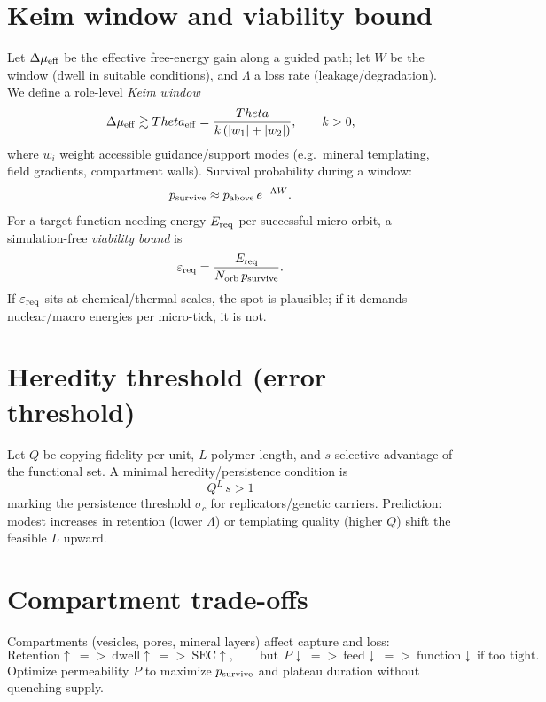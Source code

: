 \documentclass[12pt,a4paper,oneside]{scrreprt}
\def\Theta{Theta}%
\def\Rightarrow{=>}%
\begin{document}
\section{Keim window and viability bound}\label{sec:life-keim}
Let $\Delta\mu_{\rm eff}$ be the effective free-energy gain along a guided path; let $W$ be the window (dwell in suitable conditions), and $\Lambda$ a loss rate (leakage/degradation).
We define a role-level \emph{Keim window}
\begin{equation}
\Delta\mu_{\rm eff} \gtrsim \Theta_{\rm eff}
=\frac{\Theta}{k\,(|w_1|+|w_2|)},
\qquad k>0,
\end{equation}
where $w_i$ weight accessible guidance/support modes (e.g.\ mineral templating, field gradients, compartment walls). 
Survival probability during a window:
\begin{equation}
p_{\rm survive}\approx p_{\rm above}\,e^{-\Lambda W}.
\end{equation}
For a target function needing energy $E_{\rm req}$ per successful micro-orbit, a simulation-free \emph{viability bound} is
\begin{equation}
\varepsilon_{\rm req}=\frac{E_{\rm req}}{N_{\rm orb}\,p_{\rm survive}}.
\end{equation}
If $\varepsilon_{\rm req}$ sits at chemical/thermal scales, the spot is plausible; if it demands nuclear/macro energies per micro-tick, it is not.

\section{Heredity threshold (error threshold)}\label{sec:life-heredity}
Let $Q$ be copying fidelity per unit, $L$ polymer length, and $s$ selective advantage of the functional set. 
A minimal heredity/persistence condition is
\begin{equation}
\boxed{~Q^{L}\,s>1~}
\end{equation}
marking the persistence threshold $\sigma_c$ for replicators/genetic carriers. 
Prediction: modest increases in retention (lower $\Lambda$) or templating quality (higher $Q$) shift the feasible $L$ upward.

\section{Compartment trade-offs}\label{sec:life-compartments}
Compartments (vesicles, pores, mineral layers) affect capture and loss:
\[
\text{Retention}\uparrow\ \Rightarrow\ \text{dwell}\uparrow\ \Rightarrow\ \text{SEC}\uparrow,
\qquad 
\text{but}\ \ P\downarrow\ \Rightarrow\ \text{feed}\downarrow\ \Rightarrow\ \text{function}\downarrow \ \text{if too tight}.
\]
Optimize permeability $P$ to maximize $p_{\rm survive}$ and plateau duration without quenching supply.
\end{document}
